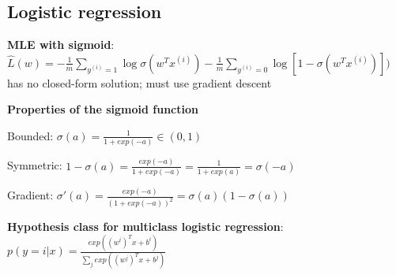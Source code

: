 \documentclass[letterpaper,fontsize=5pt]{scrartcl}
\renewenvironment{enumerate}[1]{\begin{compactenum}#1}{\end{compactenum}}
\theoremstyle{definition}
\begin{document}
\begin{multicols}{2}
\section{Logistic regression}
	\begin{enumerate}
		\item \textbf{MLE with sigmoid}: $\hat{L}(w) = - \frac{1}{m} \sum\limits_{y^{(i)} = 1} \log \sigma (w^T x^{(i)}) - \frac{1}{m} \sum\limits_{y^{(i)} = 0} \log [1 - \sigma (w^T x^{(i)})]) $ has no closed-form solution; must use gradient descent
		\item \textbf{Properties of the sigmoid function}
			\begin{enumerate}
				\item Bounded: $\sigma(a) = \frac{1}{1 + exp(-a)} \in (0,1)$
				\item Symmetric: $1-\sigma(a) = \frac{exp(-a)}{1+exp(-a)} = \frac{1}{1 + exp(a)} = \sigma(-a)$
				\item Gradient: $\sigma'(a) = \frac{exp(-a)}{(1+exp(-a))^2} = \sigma(a)(1-\sigma(a))$
			\end{enumerate}
		\item \textbf{Hypothesis class for multiclass logistic regression}:\\ $p(y=i|x) = \frac{exp( (w^i)^T x + b^i )}{\sum_j exp( (w^j)^T x + b^j )} $
	\end{enumerate}

\end{multicols}
\end{document}
